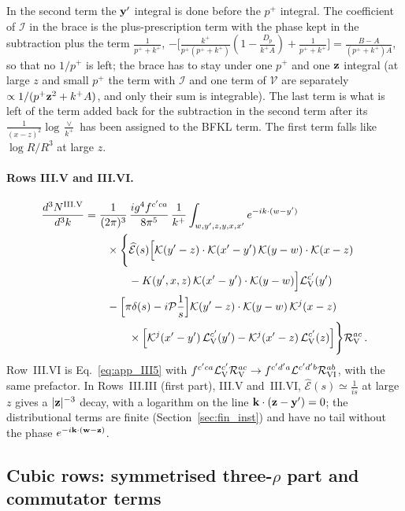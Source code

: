 In the second term the $\mathbf{y}'$ integral is done before the $p^+$ integral. The coefficient of $\mathcal I$ in the brace is the plus-prescription term with the phase kept in the subtraction plus the term $\frac{1}{p^++k^+}$, $-\big[\frac{k^+}{p^+(p^++k^+)}(1-\frac{D_p}{k^+A})+\frac{1}{p^++k^+}\big]=\frac{B-A}{(p^++k^+)A}$, so that no $1/p^+$ is left; the brace has to stay under one $p^+$ and one $\mathbf{z}$ integral (at large $z$ and small $p^+$ the term with $\mathcal I$ and one term of $\mathcal V$ are separately $\propto1/(p^+\mathbf{z}^2+k^+A)$, and only their sum is integrable). The last term is what is left of the term added back for the subtraction in the second term after its $\frac{1}{(x-z)^2}\log\frac{\vee}{k^+}$ has been assigned to the BFKL term. The first term falls like $\log R/R^3$ at large $z$.

\paragraph{Rows III.V and III.VI.}
\begin{align}\label{eq:app_III5}
\frac{d^3N^{\rm III.V}}{d^3k}&=\frac{1}{(2\pi)^3}\,\frac{ig^4f^{c'ca}}{8\pi^5}\,\frac{1}{k^+}\int_{w,y',z,y,x,x'}e^{-ik\cdot(w-y')}\notag\\
&\qquad\times\Bigg\{\widehat{\mathcal E}(s)\Big[\mathcal{K}(y'-z)\cdot\mathcal{K}(x'-y')\,\mathcal{K}(y-w)\cdot\mathcal{K}(x-z)\notag\\&\qquad\qquad-K(y',x,z)\,\mathcal{K}(x'-y')\cdot\mathcal{K}(y-w)\Big]\mathcal L_{\rm V}^{c'}(y')\notag\\
&\qquad-\Big[\pi\delta(s)-i\mathcal P\frac1s\Big]\mathcal{K}(y'-z)\cdot\mathcal{K}(y-w)\,\mathcal{K}^j(x-z)\notag\\
&\qquad\qquad\times\Big[\mathcal{K}^j(x'-y')\,\mathcal L_{\rm V}^{c'}(y')-\mathcal{K}^j(x'-z)\,\mathcal L_{\rm V}^{c'}(z)\Big]\Bigg\}\mathcal R_{\rm V}^{ac}\,.
\end{align}
Row~III.VI is Eq.~\eqref{eq:app_III5} with $f^{c'ca}\mathcal L_{\rm V}^{c'}\mathcal R_{\rm V}^{ac}\to f^{c'd'a}\mathcal L^{c'd'b}\mathcal R_{\rm VI}^{ab}$, with the same prefactor. In Rows~III.III (first part), III.V and~III.VI, $\widehat{\mathcal E}(s)\simeq\frac{1}{is}$ at large $z$ gives a $|\mathbf{z}|^{-3}$ decay, with a logarithm on the line $\mathbf{k}\cdot(\mathbf{z}-\mathbf{y}')=0$; the distributional terms are finite (Section~\ref{sec:fin_inst}) and have no tail without the phase $e^{-i\mathbf{k}\cdot(\mathbf{w}-\mathbf{z})}$.

\subsection{Cubic rows: symmetrised three-\texorpdfstring{$\rho$}{rho} part and commutator terms}\label{app:fin_sym}

